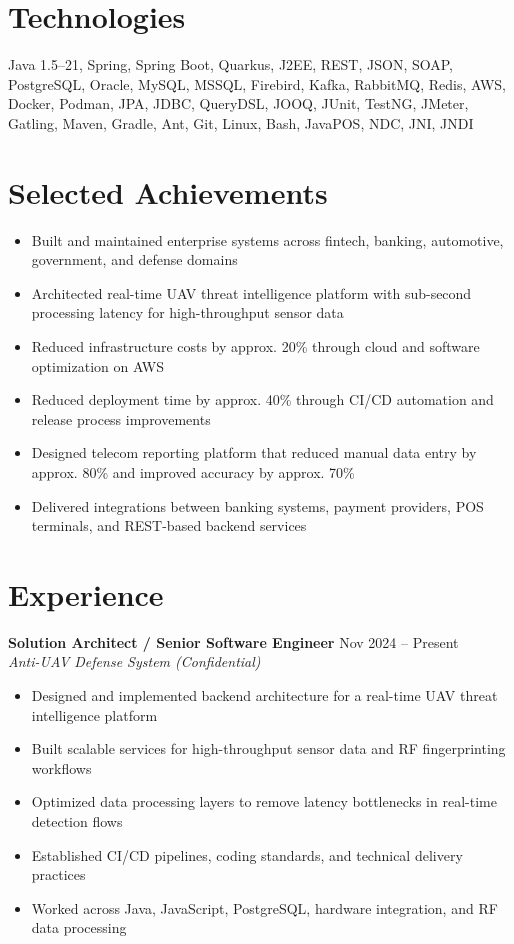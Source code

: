 \documentclass[10pt,a4paper]{article}
\begin{document}
\section*{Technologies}

Java 1.5--21, Spring, Spring Boot, Quarkus, J2EE, REST, JSON, SOAP, PostgreSQL, Oracle, MySQL, MSSQL, Firebird, Kafka, RabbitMQ, Redis, AWS, Docker, Podman, JPA, JDBC, QueryDSL, JOOQ, JUnit, TestNG, JMeter, Gatling, Maven, Gradle, Ant, Git, Linux, Bash, JavaPOS, NDC, JNI, JNDI

\section*{Selected Achievements}

\begin{itemize}
\item Built and maintained enterprise systems across fintech, banking, automotive, government, and defense domains
\item Architected real-time UAV threat intelligence platform with sub-second processing latency for high-throughput sensor data
\item Reduced infrastructure costs by approx. 20\% through cloud and software optimization on AWS
\item Reduced deployment time by approx. 40\% through CI/CD automation and release process improvements
\item Designed telecom reporting platform that reduced manual data entry by approx. 80\% and improved accuracy by approx. 70\%
\item Delivered integrations between banking systems, payment providers, POS terminals, and REST-based backend services
\end{itemize}

\section*{Experience}

\textbf{Solution Architect / Senior Software Engineer} \hfill Nov 2024 -- Present \\
\textit{Anti-UAV Defense System (Confidential)}

\begin{itemize}
\item Designed and implemented backend architecture for a real-time UAV threat intelligence platform
\item Built scalable services for high-throughput sensor data and RF fingerprinting workflows
\item Optimized data processing layers to remove latency bottlenecks in real-time detection flows
\item Established CI/CD pipelines, coding standards, and technical delivery practices
\item Worked across Java, JavaScript, PostgreSQL, hardware integration, and RF data processing
\end{itemize}
\end{document}

